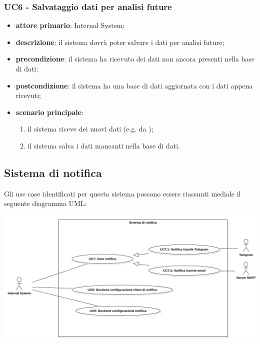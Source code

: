 \subsubsection{UC6 - Salvataggio dati per analisi future}
\begin{itemize}
	\item \textbf{attore primario}: Internal System;
	\item \textbf{descrizione}: il sistema dovrà poter salvare i dati per analisi future;
	\item \textbf{precondizione}: il sistema ha ricevuto dei dati non ancora presenti nella base di dati;
	\item \textbf{postcondizione}: il sistema ha una base di dati aggiornata con i dati appena ricevuti;
	\item \textbf{scenario principale}: 
	\begin{enumerate}
		\item il sistema riceve dei nuovi dati (e.g. da );
		\item il sistema salva i dati mancanti nella base di dati.
	\end{enumerate}
\end{itemize}
\subsection{Sistema di notifica}
Gli use case identificati per questo sistema possono essere riassunti mediale il seguente diagramma UML:
\begin{center}
	\includegraphics[keepaspectratio = true, width=15cm]{immagini/uc/5.png}
\end{center}
